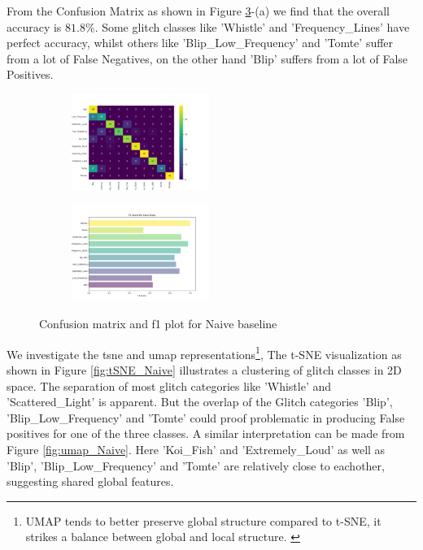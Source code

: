 From the Confusion Matrix as shown in Figure \ref{fig:cm_f1_naive_baseline}-(a) we find that the overall accuracy is $81.8 \%$. Some glitch classes like 'Whistle' and 'Frequency\_Lines' have perfect accuracy, whilst others like 'Blip\_Low\_Frequency' and 'Tomte' suffer from a lot of False Negatives, on the other hand 'Blip' suffers from a lot of False Positives. 

\begin{figure}[ht]
\centering
\begin{subfigure}
  \centering
  \includegraphics[width=0.49\textwidth]{Grad Assignment/Images/cm_MultiView_Naive_100epochs.png}  
  \label{fig:sub-first}
\end{subfigure}
\begin{subfigure}
  \centering
  \includegraphics[width=0.49\textwidth]{Grad Assignment/Images/f1_MultiView_Naive_100epochs.png}  
  \label{fig:sub-second}
\end{subfigure}
\caption{Confusion matrix and f1 plot for Naive baseline}
\label{fig:cm_f1_naive_baseline}
\end{figure}

We investigate the \acrshort{tsne} and \acrshort{umap} representations\footnote{UMAP tends to better preserve global structure compared to t-SNE, it strikes a balance between global and local structure. \citep{mcinnes2018umap}}, 
The t-SNE visualization as shown in Figure \ref{fig:tSNE_Naive} illustrates a clustering of glitch classes in 2D space. The separation of most glitch categories like 'Whistle' and 'Scattered\_Light' is apparent. But the overlap of the Glitch categories 'Blip', 'Blip\_Low\_Frequency' and 'Tomte' could proof problematic in producing False positives for one of the three classes.
A similar interpretation can be made from Figure \ref{fig:umap_Naive}. Here 'Koi\_Fish' and 'Extremely\_Loud' as well as 'Blip', 'Blip\_Low\_Frequency' and 'Tomte' are relatively close to eachother, suggesting shared global features. 

